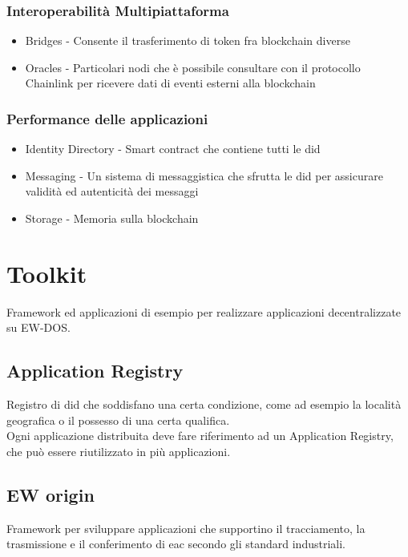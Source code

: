 \documentclass[12pt, letterpaper, twoside]{article}
\begin{document}
\subsubsection{Interoperabilità Multipiattaforma}
\begin{itemize}
    \item Bridges - Consente il trasferimento di token fra blockchain diverse
    \item Oracles - Particolari nodi che è possibile consultare con il protocollo Chainlink per ricevere dati di eventi esterni alla blockchain
\end{itemize}

\subsubsection{Performance delle applicazioni}
\begin{itemize}
    \item Identity Directory - Smart contract che contiene tutti le \gls{did}
    \item Messaging - Un sistema di messaggistica che sfrutta le \gls{did} per assicurare validità ed autenticità dei messaggi
    \item Storage - Memoria sulla blockchain
\end{itemize}

\newpage

\section{Toolkit}
Framework ed applicazioni di esempio per realizzare applicazioni decentralizzate su EW-DOS. \\

\subsection{Application Registry}
Registro di \gls{did} che soddisfano una certa condizione, come ad esempio la località geografica o il possesso di una certa qualifica.\\
Ogni applicazione distribuita deve fare riferimento ad un Application Registry, che può essere riutilizzato in più applicazioni.

\subsection{EW origin}
Framework per sviluppare applicazioni che supportino il tracciamento, la trasmissione e il conferimento di \gls{eac} secondo gli standard industriali.
\end{document}
